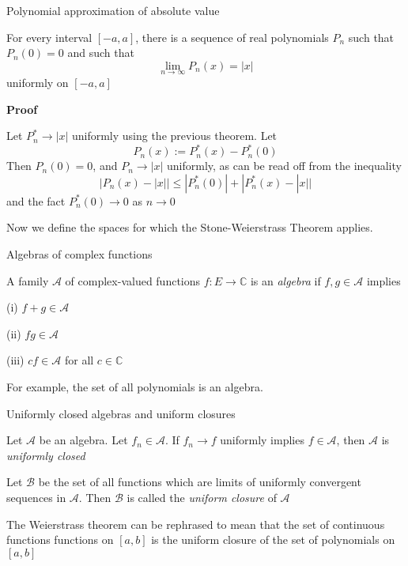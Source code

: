 \begin{theorem} Polynomial approximation of absolute value

    For every interval $[-a, a]$, there is a sequence of real polynomials $P_n$ such that $P_n(0) = 0$ and such that
    \[\lim_{n \to \infty} P_n(x) = |x|\]
    uniformly on $[-a, a]$

    \textbf{Proof}

    Let $P_n^\ast \rightarrow |x|$ uniformly using the previous theorem. Let 
    \[P_n(x) := P_n^\ast(x) - P_n^\ast(0)\]
    Then $P_n(0) = 0$, and $P_n \rightarrow |x|$ uniformly, as can be read off from the inequality
    \[|P_n(x) - |x|| \leq |P_n^\ast(0)| + |P_n^\ast(x) - |x||\]
    and the fact $P_n^\ast(0) \to 0$ as $n \to 0$
\end{theorem}

Now we define the spaces for which the Stone-Weierstrass Theorem applies.

\begin{definition} Algebras of complex functions

    A family $\mathscr{A}$ of complex-valued functions $f: E \rightarrow \mathbb{C}$ is an \textit{algebra} if $f, g \in \mathscr{A}$ implies 
    \begin{definition}
        \item[(i)] $f + g \in \mathscr{A}$
        \item[(ii)] $fg \in \mathscr{A}$
        \item[(iii)] $cf \in \mathscr{A}$ for all $c \in \mathbb{C}$
    \end{definition}
\end{definition}

For example, the set of all polynomials is an algebra.

\begin{definition} Uniformly closed algebras and uniform closures

    Let $\mathscr{A}$ be an algebra. Let $f_n \in \mathscr{A}$. If $f_n \rightarrow f$ uniformly implies $f \in \mathscr{A}$, then $\mathscr{A}$ is \textit{uniformly closed}

    Let $\mathscr{B}$ be the set of all functions which are limits of uniformly convergent sequences in $\mathscr{A}$. Then $\mathscr{B}$ is called the \textit{uniform closure} of $\mathscr{A}$
\end{definition}

The Weierstrass theorem can be rephrased to mean that the set of continuous functions functions on $[a, b]$ is the uniform closure of the set of polynomials on $[a, b]$

